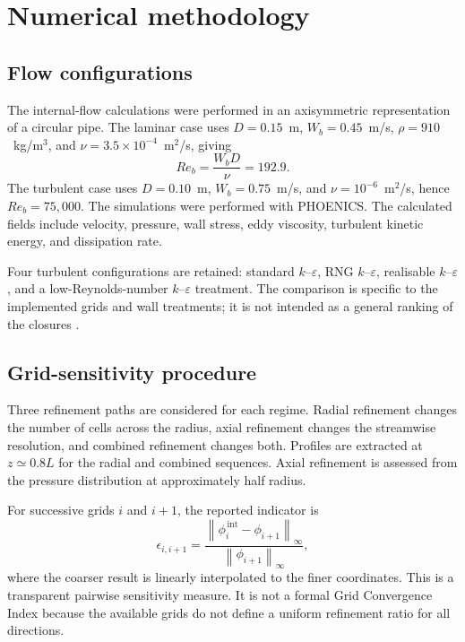 \section{Numerical methodology}

\subsection{Flow configurations}

The internal-flow calculations were performed in an axisymmetric representation of a circular pipe. The laminar case uses $D=0.15$~m, $W_b=0.45$~m/s, $\rho=910$~kg/m$^3$, and $\nu=3.5\times10^{-4}$~m$^2$/s, giving
\begin{equation}
Re_b=\frac{W_bD}{\nu}=192.9.
\end{equation}
The turbulent case uses $D=0.10$~m, $W_b=0.75$~m/s, and $\nu=10^{-6}$~m$^2$/s, hence $Re_b=75{,}000$. The simulations were performed with PHOENICS. The calculated fields include velocity, pressure, wall stress, eddy viscosity, turbulent kinetic energy, and dissipation rate.

Four turbulent configurations are retained: standard $k$--$\varepsilon$, RNG $k$--$\varepsilon$, realisable $k$--$\varepsilon$, and a low-Reynolds-number $k$--$\varepsilon$ treatment. The comparison is specific to the implemented grids and wall treatments; it is not intended as a general ranking of the closures \cite{launder1974}.

\subsection{Grid-sensitivity procedure}

Three refinement paths are considered for each regime. Radial refinement changes the number of cells across the radius, axial refinement changes the streamwise resolution, and combined refinement changes both. Profiles are extracted at $z\simeq0.8L$ for the radial and combined sequences. Axial refinement is assessed from the pressure distribution at approximately half radius.

For successive grids $i$ and $i+1$, the reported indicator is
\begin{equation}
\epsilon_{i,i+1}=\frac{\left\|\phi_i^{\,\mathrm{int}}-\phi_{i+1}\right\|_\infty}
{\left\|\phi_{i+1}\right\|_\infty},
\end{equation}
where the coarser result is linearly interpolated to the finer coordinates. This is a transparent pairwise sensitivity measure. It is not a formal Grid Convergence Index because the available grids do not define a uniform refinement ratio for all directions.

